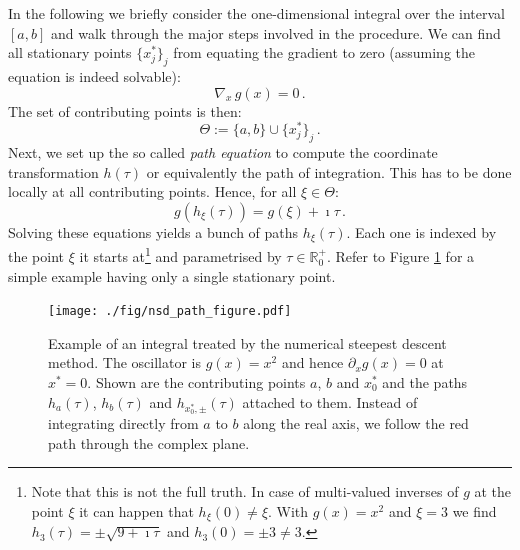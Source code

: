 \documentclass[a4paper,10pt]{article}
\begin{document}
In the following we briefly consider the one-dimensional integral over the interval
$[a,b]$ and walk through the major steps involved in the procedure. We can find all
stationary points $\{x_{j}^{*}\}_{j}$ from equating the gradient to zero (assuming
the equation is indeed solvable):
\begin{equation}
  \nabla_{x} \, g(x) = 0 \,.
\end{equation}
The set of contributing points is then:
\begin{equation}
  \Theta := \{a, b\} \cup \{x^{*}_j\}_j \,.
\end{equation}
Next, we set up the so called \emph{path equation} to compute the coordinate
transformation $h(\tau)$ or equivalently the path of integration. This has to
be done locally at all contributing points. Hence, for all $\xi \in \Theta$:
\begin{equation}
  g(h_\xi(\tau)) = g(\xi) + \imath \tau \,.
\end{equation}
Solving these equations yields a bunch of paths $h_{\xi}(\tau)$. Each one is
indexed by the point $\xi$ it starts at\footnote{Note that this is not the full truth.
In case of multi-valued inverses of $g$ at the point $\xi$ it can happen that
$h_\xi(0) \neq \xi$. With $g (x)= x^2$ and $\xi = 3$ we find $h_3(\tau) = \pm \sqrt{9+\imath\tau}$
and $h_3(0) = \pm 3 \neq 3$.}
and parametrised by $\tau \in \mathbb{R}_0^{+}$.
Refer to Figure \ref{fig:nsd_path_example} for a simple example having only a single
stationary point.

\begin{figure}
  \centering
  \texttt{[image: ./fig/nsd\_path\_figure.pdf]}
  \caption{Example of an integral treated by the numerical steepest descent method.
  The oscillator is $g(x) = x^2$ and hence $\partial_x g(x) = 0$ at $x^{*} = 0$.
  Shown are the contributing points $a$, $b$ and $x_0^{*}$ and the paths
  $h_a(\tau)$, $h_b(\tau)$ and $h_{x_0^{*},\pm}(\tau)$ attached to them.
  Instead of integrating directly from $a$ to $b$ along the real axis, we follow
  the red path through the complex plane.}
  \label{fig:nsd_path_example}
\end{figure}
\end{document}
